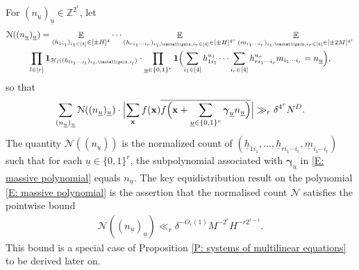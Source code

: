 \documentclass[11pt]{amsart}
\theoremstyle{definition}
\DeclareMathOperator*{\E}{\mathbb{E}}
\newcommand{\Z}{{\mathbb Z}}
\newcommand{\CH}{{\mathcal H}}
\newcommand{\CN}{{\mathcal N}}
\newcommand{\bx}{{\mathbf{x}}}
\newcommand{\bgamma}{{\boldsymbol{\gamma}}}
\newcommand{\uh}{{\underline{h}}}
\newcommand{\um}{{\underline{m}}}
\newcommand{\uu}{{\underline{u}}}
\newcommand{\Bigabs}[1]{\Bigl| #1 \Bigr|}
\newcommand{\brac}[1]{\mathopen{}\left( #1 \mathclose{}\right)}
\newcommand{\Bigbrac}[1]{\Bigl( #1 \Bigr)}
\begin{document}
For $(n_\uu)_\uu\in\Z^{2^r}$, let
\begin{multline*}
    \CN((n_\uu)_{\uu}) = \E_{(h_{1i_1})_{i_1\in [4]}\in[\pm H]^4}
    \cdots \E_{(h_{ri_1\cdots i_r})_{i_1, \ldots, i_r\in [4]}\in[\pm H]^{4^r}}
    \E_{(m_{i_1\cdots  i_r})_{i_1, \ldots, i_r\in [4]}\in[\pm 2M]^{4^r}}\\ 
    \prod_{l\in[r]}\mathbf{1}_{\CH_l((h_{li_1\cdots i_l})_{i_1, \ldots, i_l})}\cdot \prod_{\uu\in\{0,1\}^{r}} \mathbf{1}\Bigbrac{\sum_{\substack{i_1\in [4]}}h_{1i_1}^{u_1}\cdots \sum_{\substack{i_r\in [4]}} h_{ri_1\cdots  i_r}^{u_{r}} m_{i_1\cdots  i_r} = n_\uu}, 
\end{multline*}
so that
\begin{align}\label{E: inserting K}
    \sum_{(n_\uu)_\uu}\CN((n_\uu)_\uu)\cdot\Bigabs{\sum_\bx f(\bx) \overline{f\Bigbrac{\bx + \sum_{\uu\in\{0,1\}^{r}}\bgamma_\uu n_\uu}}} \gg_r \delta^{4^r} N^D.
\end{align}
The quantity $\CN((n_\uu))$ is the normalized count of $\brac{\uh_{1i_1}, \ldots, \uh_{ri_1\cdots i_r}, \um_{i_1\cdots i_r}}$ such that for each $\uu\in\{0,1\}^{r}$, the subpolynomial associated with $\bgamma_\uu$ in \eqref{E: massive polynomial} equals $n_\uu$. The key equidistribution result on the polynomial \eqref{E: massive polynomial} is the assertion that the normalised count $\CN$ satisfies the pointwise bound
\begin{align}\label{E: pointwise bound on K}
    \CN((n_\uu)_\uu)\ll_r \delta^{-O_r(1)} M^{-2^r}H^{-r2^{r-1}}.
\end{align}
This bound is a special case of Proposition \ref{P: systems of multilinear equations} to be derived later on.
\end{document}
